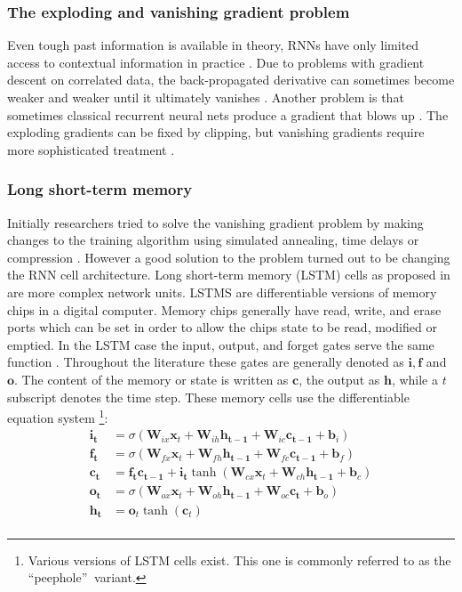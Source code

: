 \subsubsection{The exploding and vanishing gradient problem}
Even tough past information is available in theory, RNNs have only limited access to contextual information in practice \cite[page 1]{Graves2008}. Due to problems with gradient descent on correlated data, the back-propagated derivative can sometimes become weaker and weaker until it ultimately vanishes \cite{Hochreiter1998}. Another problem is that sometimes classical recurrent neural nets produce a gradient that blows up \cite{Pascanu2012}. The exploding gradients can be fixed by clipping, but vanishing gradients require more sophisticated treatment \cite{Bengio1993}.

\subsubsection{Long short-term memory}
Initially researchers tried to solve the vanishing gradient problem by making changes to the training algorithm using simulated annealing, time delays or compression \cite[page 32]{Graves2008}. However a good solution to the problem turned out to be changing the RNN cell architecture. Long short-term memory (LSTM) cells as proposed in \cite{Hochreiter1995} are more complex network units. LSTMS are differentiable versions of memory chips in a digital computer. Memory chips generally have read, write, and erase ports which can be set in order to allow the chips state to be read, modified or emptied. In the LSTM case the input, output, and forget gates serve the same function \cite[page 33]{Graves2008}. Throughout the literature these gates are generally denoted as $\mathbf{i}, \mathbf{f}$ and $\mathbf{o}$. The content of the memory or state is written as $\mathbf{c}$, the output as $\mathbf{h}$, while a $t$ subscript denotes the time step.
These memory cells use the differentiable equation system \cite[page 5]{Graves2013}\footnote{ Various versions of LSTM cells exist. This one is commonly referred to as the \textquotedblleft peephole\textquotedblright $ \: $ variant. }:
\begin{align}
\mathbf{i_t} &= \sigma (\mathbf{W}_{ix} \mathbf{x}_t + \mathbf{W}_{ih} \mathbf{h_{t-1}} + \mathbf{W}_{ic} \mathbf{c_{t-1}} +\mathbf{ b}_i) \\
\mathbf{f_t} &= \sigma (\mathbf{W}_{fx} \mathbf{x}_t + \mathbf{W}_{fh} \mathbf{h_{t-1}} + \mathbf{W}_{fc} \mathbf{c_{t-1}} +\mathbf{ b}_f) \\
\mathbf{c_t} &= \mathbf{f_t} \mathbf{c_{t-1}} + \mathbf{i_t} \tanh( \mathbf{W}_{cx} \mathbf{x}_t + \mathbf{W}_{ch} \mathbf{h_{t-1}} + \mathbf{b}_c ) \\
\mathbf{o_t} &= \sigma (\mathbf{W}_{ox} \mathbf{x}_t + \mathbf{W}_{oh} \mathbf{h_{t-1}} + \mathbf{W}_{oc} \mathbf{c_t} + \mathbf{b}_o ) \\
\mathbf{h_t} &= \mathbf{o}_t \tanh(\mathbf{c}_t) \\
\end{align}
